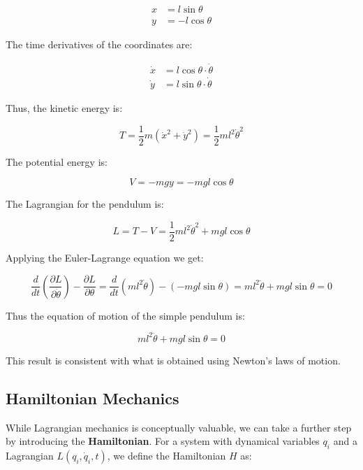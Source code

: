\begin{align}
    x &= l \sin{\theta} \\
    y &= -l \cos{\theta} 
\end{align}

The time derivatives of the coordinates are:

\begin{align}
    \label{eq:2-12}
    \dot{x} &= l \cos{\theta} \cdot \dot{\theta} \\
    \label{eq:2-13}
    \dot{y} &= l \sin{\theta} \cdot \dot{\theta} 
\end{align}

Thus, the kinetic energy is:

\begin{equation}
    T=\frac{1}{2} m \left(\dot{x}^2+\dot{y}^2\right) = \frac{1}{2} ml^2\dot{\theta}^2
\end{equation}

The potential energy is:

\begin{equation}
    V=-mgy=-mgl\cos{\theta}
\end{equation}

The Lagrangian for the pendulum is:

\begin{equation}
    L=T-V=\frac{1}{2}ml^2\dot{\theta}^2+mgl\cos{\theta}
\end{equation}

Applying the Euler-Lagrange equation we get:

\begin{equation}
    \frac{d}{dt}\left(\frac{\partial L}{\partial\dot{\theta}}\right) - \frac{\partial L}{\partial\theta} = \frac{d}{dt}(ml^2\dot{\theta}) - (-mgl\sin{\theta})=ml^2\ddot{\theta}+mgl\sin{\theta}=0
\end{equation}

Thus the equation of motion of the simple pendulum is:

\begin{equation}
    ml^2\ddot{\theta}+mgl\sin{\theta}=0
\end{equation}

This result is consistent with what is obtained using Newton's laws of motion.

\subsection{Hamiltonian Mechanics}

While Lagrangian mechanics is conceptually valuable, we can take a further step by 
introducing the \textbf{Hamiltonian}. For a system with dynamical variables $q_i$ and a 
Lagrangian $L(q_i, \dot{q}_i, t)$, we define the Hamiltonian $H$ as:

